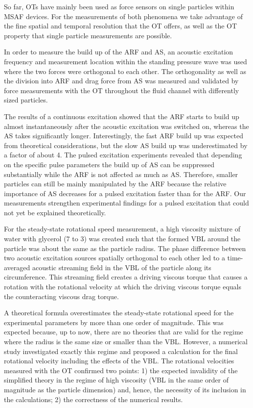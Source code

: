 So far, OTs have mainly been used as force sensors on single particles within 
MSAF devices. For the measurements of both phenomena we take advantage of the 
fine spatial and temporal resolution that the OT offers, as well as the OT 
property that single particle measurements are possible.

In order to measure the build up of the ARF and AS, an acoustic excitation 
frequency and measurement location within the standing pressure wave was used 
where the two forces were orthogonal to each other. The orthogonality as well 
as the division into ARF and drag force from AS was measured and validated by 
force measurements with the OT throughout the fluid channel with differently 
sized particles.

The results of a continuous excitation showed that the ARF starts to build up 
almost instantaneously after the acoustic excitation was switched on, whereas 
the AS takes significantly longer. Interestingly, the fast ARF build up was 
expected from theoretical considerations, but the slow AS build up was 
underestimated by a factor of about 4. The pulsed excitation experiments 
revealed that depending on the specific pulse parameters the build up of AS can 
be suppressed substantially while the ARF is not affected as much as AS. 
Therefore, smaller particles can still be mainly manipulated by the ARF because 
the relative importance of AS decreases for a pulsed excitation faster than for 
the ARF. Our measurements strengthen experimental findings for a pulsed 
excitation that could not yet be explained theoretically.

For the steady-state rotational speed measurement, a high viscosity mixture of 
water with glycerol (7 to 3) was created such that the formed VBL around the 
particle was about the same as the particle radius. The phase difference 
between two acoustic excitation sources spatially orthogonal to each other led 
to a time-averaged acoustic streaming field in the VBL of the particle along 
its circumference. This streaming field creates a driving viscous torque that 
causes a rotation with the rotational velocity at which the driving viscous 
torque equals the counteracting viscous drag torque.

A theoretical formula overestimates the steady-state rotational speed for the 
experimental parameters by more than one order of magnitude. This was expected 
because, up to now, there are no theories that are valid for the regime where 
the radius is the same size or smaller than the VBL. However, a numerical study 
investigated exactly this regime and proposed a calculation for the final 
rotational velocity including the effects of the VBL. The rotational velocities 
measured with the OT confirmed two points: 1) the expected invalidity of the 
simplified theory in the regime of high viscosity (VBL in the same order of 
magnitude as the particle dimension) and, hence, the necessity of its inclusion 
in the calculations; 2) the correctness of the numerical results.


